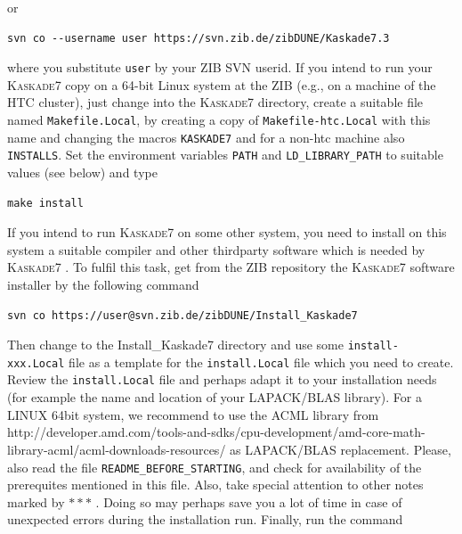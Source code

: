 \documentclass[11pt]{article}
\newcommand{\K}{\textsc{Kaskade7 }}
\begin{document}
or

\begin{scriptsize} 
\begin{verbatim} 
svn co --username user https://svn.zib.de/zibDUNE/Kaskade7.3
\end{verbatim} 
\end{scriptsize} 


\noindent where you substitute {\tt user} 
by your ZIB SVN userid. If you intend to run 
your \K copy on a 64-bit Linux system at the ZIB (e.g., on a machine of the HTC cluster), just change into the \K directory, 
create a suitable file named {\tt Makefile.Local}, by creating a copy of {\tt Makefile-htc.Local} 
with this name and changing the macros {\tt KASKADE7} and for a non-htc machine also {\tt INSTALLS}. 
Set the environment variables {\tt PATH} and {\tt LD\_LIBRARY\_PATH} to suitable values (see below) 
and type 

\begin{scriptsize} 
\begin{verbatim} 
make install 
\end{verbatim} 
\end{scriptsize} 

\noindent If you intend to run \K on some other system, you need to install on this system a suitable 
compiler and other thirdparty software which is needed by \K. 
To fulfil this task, get from the ZIB repository the \K software installer by the following command 

\begin{scriptsize} 
\begin{verbatim} 
svn co https://user@svn.zib.de/zibDUNE/Install_Kaskade7
\end{verbatim} 
\end{scriptsize} 

\noindent Then change to the Install\_Kaskade7 directory and use some {\tt install-xxx.Local} file as a template for 
the {\tt install.Local} file which you need to create. Review the {\tt install.Local} file and perhaps adapt it to 
your installation needs (for example the name and location of your LAPACK/BLAS library). For a LINUX 64bit system, we
recommend to use the ACML library from http://developer.amd.com/tools-and-sdks/cpu-development/amd-core-math-library-acml/acml-downloads-resources/
as LAPACK/BLAS replacement. 
\newline Please, also read the file {\tt README\_BEFORE\_STARTING}, and check for availability of the prerequites mentioned in this file. Also, take special attention to other notes marked by $\ast\ast\ast$ . Doing so may perhaps save you a lot of time in case of unexpected errors during the installation run.
Finally, run the command 
\end{document}
